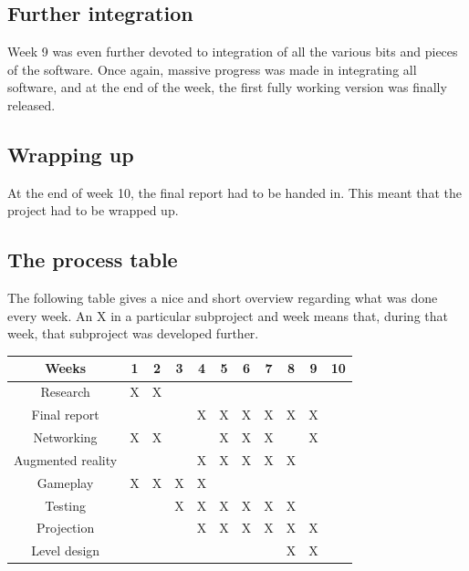       \subsection{Further integration}
      Week 9 was even further devoted to integration of all the various bits and
      pieces of the software. Once again, massive progress was made in
      integrating all software, and at the end of the week, the first fully
      working version was finally released. 
      
      \subsection{Wrapping up}
      At the end of week 10, the final report had to be handed in. This meant
      that the project had to be wrapped up.
      
      \subsection{The process table} \label{ssec:processtable}
      The following table gives a nice and short overview regarding what was done
      every week. An X in a particular subproject and week means that, during that
      week, that subproject was developed further.\\
      \begin{table}[!ht]
	      \begin{tabular}{| c | c | c | c | c | c | c | c | c | c | c |}
	      	      \hline
	      	      Weeks & 1 & 2 & 3 & 4 & 5 & 6 & 7 & 8 & 9 & 10 \\
	      	      \hline
	      	      Research & X & X & \space & \space & \space & \space & \space & \space & \space & \space \\
	      	      \hline
	      	      Final report & \space & \space & \space & X & X & X & X & X & X & \space \\
	      	      \hline
	      	      Networking & X & X & \space & \space & X & X & X & \space & X & \space \\
	      	      \hline
	      	      Augmented reality & \space & \space & \space & X & X & X & X & X & \space & \space \\
	      	      \hline
	      	      Gameplay & X & X & X & X & \space & \space & \space & \space & \space & \space \\
	      	      \hline
	      	      Testing & \space & \space & X & X & X & X & X & X & \space & \space \\
	      	      \hline
	      	      Projection & \space & \space & \space & X & X & X & X & X & X & \space \\
		      	  \hline
		      	  Level design & \space & \space & \space & \space & \space & \space & \space & X & X & \space \\
		      	  \hline
	      \end{tabular}
      \end{table}
